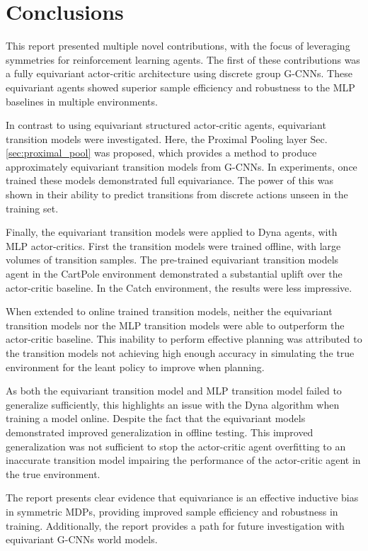 \chapter{Conclusions}\label{sec:conclusions}
This report presented multiple novel contributions, with the focus of leveraging symmetries for reinforcement learning agents. The first of these contributions was a fully equivariant actor-critic architecture using discrete group G-CNNs. These equivariant agents showed superior sample efficiency and robustness to the MLP baselines in multiple environments.

In contrast to using equivariant structured actor-critic agents, equivariant transition models were investigated. Here, the Proximal Pooling layer Sec.\ref{sec:proximal_pool} was proposed, which provides a method to produce approximately equivariant transition models from G-CNNs. In experiments, once trained these models demonstrated full equivariance. The power of this was shown in their ability to predict transitions from discrete actions unseen in the training set.

Finally, the equivariant transition models were applied to Dyna agents, with MLP actor-critics. First the transition models were trained offline, with large volumes of transition samples. The pre-trained equivariant transition models agent in the CartPole environment demonstrated a substantial uplift over the actor-critic baseline. In the Catch environment, the results were less impressive.

When extended to online trained transition models, neither the equivariant transition models nor the MLP transition models were able to outperform the actor-critic baseline. This inability to perform effective planning was attributed to the transition models not achieving high enough accuracy in simulating the true environment for the leant policy to improve when planning.

As both the equivariant transition model and MLP transition model failed to generalize sufficiently, this highlights an issue with the Dyna algorithm when training a model online. Despite the fact that the equivariant models demonstrated improved generalization in offline testing. This improved generalization was not sufficient to stop the actor-critic agent overfitting to an inaccurate transition model impairing the performance of the actor-critic agent in the true environment.

The report presents clear evidence that equivariance is an effective inductive bias in symmetric MDPs, providing improved sample efficiency and robustness in training. Additionally, the report provides a path for future investigation with equivariant G-CNNs world models.


